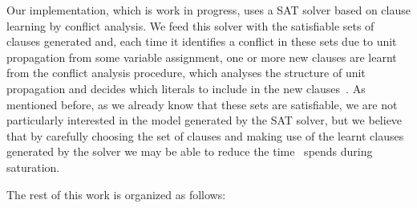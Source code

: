 Our implementation, which is work in progress, uses a SAT solver based on clause
learning by conflict analysis. We feed this solver with the satisfiable sets of
clauses generated and, each time it identifies a conflict in these sets due to
unit propagation from some variable assignment, one or more new clauses are
learnt from the conflict analysis procedure, which analyses the structure of
unit propagation and decides which literals to include in the new
clauses~\cite{cdclchapter}. As mentioned before, as we already know that these
sets are satisfiable, we are not particularly interested in the model generated
by the SAT solver, but we believe that by carefully choosing the set of clauses
and making use of the learnt clauses generated by the solver we may be able to
reduce the time \ksp~spends during saturation. 

The rest of this work is organized as follows:
